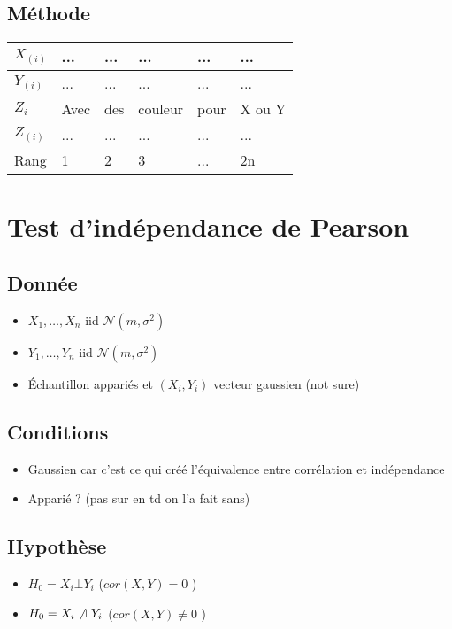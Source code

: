 \documentclass{article}
\theoremstyle{plain}%
\theoremstyle{definition}
\theoremstyle{remark}
\begin{document}
\subsection*{Méthode}
\begin{table}[!ht]
    \centering
    \begin{tabular}{|l|l|l|l|l|l|}
    \hline
        $X_{(i)}$ & ... & ... & ... & ... & ... \\ \hline
        $Y_{(i)}$ & ... & ... & ... & ... & ... \\ \hline
        $Z_i$ & Avec & des & couleur & pour & X ou Y \\ \hline
        $Z_{(i)}$ & ... & ... & ... & ... & ... \\ \hline
        Rang & 1 & 2 & 3 & ... & 2n \\ \hline
    \end{tabular}
\end{table}

\section{Test d'indépendance de Pearson}
\subsection*{Donnée}
\begin{itemize}
    \item $ X_1, \dots, X_n $ iid $ \mathcal{N}(m,\sigma ^2) $ 
    \item $ Y_1, \dots, Y_n $ iid $ \mathcal{N}(m,\sigma ^2) $ 
    \item Échantillon appariés et $ (X_i,Y_i) $ vecteur gaussien (not sure)
\end{itemize}

\subsection*{Conditions}
\begin{itemize}
    \item Gaussien car c'est ce qui créé l'équivalence entre corrélation et indépendance
    \item Apparié ? (pas sur en td on l'a fait sans)
\end{itemize}

\subsection*{Hypothèse}
\begin{itemize}
    \item $ H_0 = X_i \bot Y_i $ ($ cor(X,Y) = 0 $ )
    \item $ H_0 = X_i \not\bot Y_i $ ($ cor(X,Y) \neq 0 $ )
\end{itemize}
\end{document}
